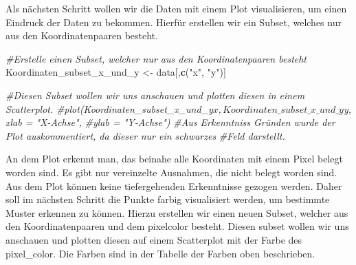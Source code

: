\documentclass[
]{article}
\newenvironment{Shaded}{\begin{snugshade}}{\end{snugshade}}
\newcommand{\AttributeTok}[1]{\textcolor[rgb]{0.13,0.29,0.53}{#1}}
\newcommand{\CommentTok}[1]{\textcolor[rgb]{0.56,0.35,0.01}{\textit{#1}}}
\newcommand{\DecValTok}[1]{\textcolor[rgb]{0.00,0.00,0.81}{#1}}
\newcommand{\FunctionTok}[1]{\textcolor[rgb]{0.13,0.29,0.53}{\textbf{#1}}}
\newcommand{\NormalTok}[1]{#1}
\newcommand{\OtherTok}[1]{\textcolor[rgb]{0.56,0.35,0.01}{#1}}
\newcommand{\SpecialCharTok}[1]{\textcolor[rgb]{0.81,0.36,0.00}{\textbf{#1}}}
\newcommand{\StringTok}[1]{\textcolor[rgb]{0.31,0.60,0.02}{#1}}
\begin{document}
Als nächsten Schritt wollen wir die Daten mit einem Plot visualisieren,
um einen Eindruck der Daten zu bekommen. Hierfür erstellen wir ein
Subset, welches nur aus den Koordinatenpaaren besteht.

\begin{Shaded}
\begin{Highlighting}[]
\CommentTok{\#Erstelle einen Subset, welcher nur aus den Koordinatenpaaren besteht}
\NormalTok{Koordinaten\_subset\_x\_und\_y }\OtherTok{\textless{}{-}}\NormalTok{ data[,}\FunctionTok{c}\NormalTok{(}\StringTok{"x"}\NormalTok{, }\StringTok{"y"}\NormalTok{)]}

\CommentTok{\#Diesen Subset wollen wir uns anschauen und plotten diesen in einem Scatterplot.}
\CommentTok{\#plot(Koordinaten\_subset\_x\_und\_y$x, Koordinaten\_subset\_x\_und\_y$y, xlab = "X{-}Achse", }
      \CommentTok{\#ylab = "Y{-}Achse")}
\CommentTok{\#Aus Erkenntniss Gründen wurde der Plot auskommentiert, da dieser nur ein schwarzes }
  \CommentTok{\#Feld darstellt.}
\end{Highlighting}
\end{Shaded}

An dem Plot erkennt man, das beinahe alle Koordinaten mit einem Pixel
belegt worden sind. Es gibt nur vereinzelte Ausnahmen, die nicht belegt
worden sind. Aus dem Plot können keine tiefergehenden Erkenntnisse
gezogen werden. Daher soll im nächsten Schritt die Punkte farbig
visualisiert werden, um bestimmte Muster erkennen zu können. Hierzu
erstellen wir einen neuen Subset, welcher aus den Koordinatenpaaren und
dem pixelcolor besteht. Diesen subset wollen wir uns anschauen und
plotten diesen auf einem Scatterplot mit der Farbe des pixel\_color. Die
Farben sind in der Tabelle der Farben oben beschrieben.

\begin{Shaded}
\end{Shaded}
\end{document}
